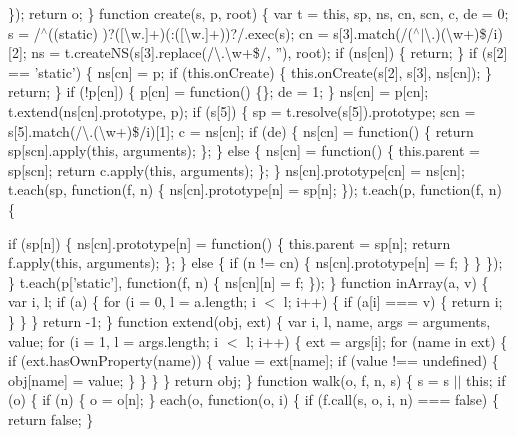 \begin{DoxyCompactItemize}
{		\}); return o; \}  function create(s, p, root) \{ var t = this, sp, ns, cn, scn, c, de = 0;  s = /$^\wedge$((static) )?(\mbox{[}\textbackslash{}w.\mbox{]}+)(\+:(\mbox{[}\textbackslash{}w.\mbox{]}+))?/.\+exec(s); cn = s\mbox{[}3\mbox{]}.\+match(/($^\wedge$$\vert$\textbackslash{}.)(\textbackslash{}w+)\$/i)\mbox{[}2\mbox{]};   ns = t.\+create\+N\+S(s\mbox{[}3\mbox{]}.\+replace(/\textbackslash{}.\textbackslash{}w+\$/, ''), root);  if (ns\mbox{[}cn\mbox{]}) \{ return; \}  if (s\mbox{[}2\mbox{]} == 'static') \{ ns\mbox{[}cn\mbox{]} = p; if (this.\+on\+Create) \{ this.\+on\+Create(s\mbox{[}2\mbox{]}, s\mbox{[}3\mbox{]}, ns\mbox{[}cn\mbox{]}); \} return; \}  if (!p\mbox{[}cn\mbox{]}) \{ p\mbox{[}cn\mbox{]} = function() \{\}; de = 1; \}  ns\mbox{[}cn\mbox{]} = p\mbox{[}cn\mbox{]}; t.\+extend(ns\mbox{[}cn\mbox{]}.\+prototype, p);  if (s\mbox{[}5\mbox{]}) \{ sp = t.\+resolve(s\mbox{[}5\mbox{]}).\+prototype; scn = s\mbox{[}5\mbox{]}.\+match(/\textbackslash{}.(\textbackslash{}w+)\$/i)\mbox{[}1\mbox{]};   c = ns\mbox{[}cn\mbox{]}; if (de) \{  ns\mbox{[}cn\mbox{]} = function() \{ return sp\mbox{[}scn\mbox{]}.\+apply(this, arguments); \}; \} else \{  ns\mbox{[}cn\mbox{]} = function() \{ this.\+parent = sp\mbox{[}scn\mbox{]}; return c.\+apply(this, arguments); \}; \} ns\mbox{[}cn\mbox{]}.\+prototype\mbox{[}cn\mbox{]} = ns\mbox{[}cn\mbox{]};  t.\+each(sp, function(f, n) \{
				ns\mbox{[}cn\mbox{]}.\+prototype\mbox{[}n\mbox{]} = sp\mbox{[}n\mbox{]};
			\});  t.\+each(p, function(f, n) \{
				
				if (sp\mbox{[}n\mbox{]}) \{
					ns\mbox{[}cn\mbox{]}.\+prototype\mbox{[}n\mbox{]} = function() \{
						this.\+parent = sp\mbox{[}n\mbox{]};
						return f.\+apply(this, arguments);
					\};
				\} else \{
					if (n != cn) \{
						ns\mbox{[}cn\mbox{]}.\+prototype\mbox{[}n\mbox{]} = f;
					\}
				\}
			\}); \}   t.\+each(p\mbox{[}'static'\mbox{]}, function(f, n) \{
			ns\mbox{[}cn\mbox{]}\mbox{[}n\mbox{]} = f;
		\}); \}  function in\+Array(a, v) \{ var i, l; if (a) \{ for (i = 0, l = a.\+length; i $<$ l; i++) \{ if (a\mbox{[}i\mbox{]} === v) \{ return i; \} \} \} return -\/1; \} function extend(obj, ext) \{ var i, l, name, args = arguments, value; for (i = 1, l = args.\+length; i $<$ l; i++) \{ ext = args\mbox{[}i\mbox{]}; for (name in ext) \{ if (ext.\+has\+Own\+Property(name)) \{ value = ext\mbox{[}name\mbox{]}; if (value !== undefined) \{ obj\mbox{[}name\mbox{]} = value; \} \} \} \} return obj; \}  function walk(o, f, n, s) \{ s = s $\vert$$\vert$ this; if (o) \{ if (n) \{ o = o\mbox{[}n\mbox{]}; \} each(o, function(o, i) \{
				if (f.\+call(s, o, i, n) === false) \{
					return false;
				\}

}
\end{DoxyCompactItemize}
